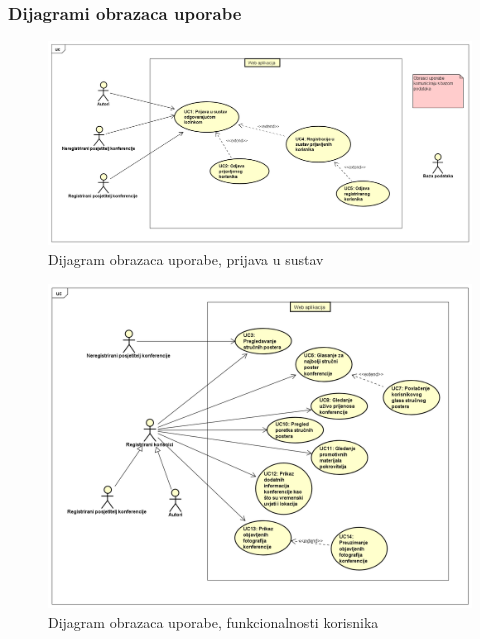 				\subsubsection{Dijagrami obrazaca uporabe}
				
					\begin{figure}[H]
						\includegraphics[width=\textwidth]{slike/prijavaUseCase.PNG} %
						\caption{Dijagram obrazaca uporabe, prijava u sustav}
						\label{fig:prijava-dijagram} %
					\end{figure}
					
					\begin{figure}[H]
						\includegraphics[width=\textwidth]{slike/korisniciUseCase.PNG} %
						\caption{Dijagram obrazaca uporabe, funkcionalnosti korisnika}
						\label{fig:korisnik-dijagram} %
					\end{figure}
					
